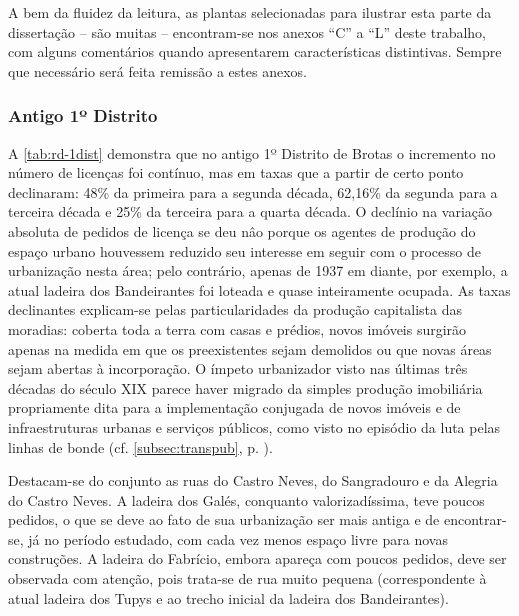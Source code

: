 A bem da fluidez da leitura, as plantas selecionadas para ilustrar esta parte da dissertação -- são muitas -- encontram-se nos anexos ``C'' a ``L'' deste trabalho, com alguns comentários quando apresentarem características distintivas. Sempre que necessário será feita remissão a estes anexos.

\subsubsection{Antigo 1º Distrito}


A \autoref{tab:rd-1dist} demonstra que no antigo 1º Distrito de Brotas o incremento no número de licenças foi contínuo, mas em taxas que a partir de certo ponto declinaram: 48\% da primeira para a segunda década, 62,16\% da segunda para a terceira década e 25\% da terceira para a quarta década. O declínio na variação absoluta de pedidos de licença se deu nâo porque os agentes de produção do espaço urbano houvessem reduzido seu interesse em seguir com o processo de urbanização nesta área; pelo contrário, apenas de 1937 em diante, por exemplo, a atual ladeira dos Bandeirantes foi loteada e quase inteiramente ocupada. As taxas declinantes explicam-se pelas particularidades da produção capitalista das moradias: coberta toda a terra com casas e prédios, novos imóveis surgirão apenas na medida em que os preexistentes sejam demolidos ou que novas áreas sejam abertas à incorporação. O ímpeto urbanizador visto nas últimas três décadas do século XIX parece haver migrado da simples produção imobiliária propriamente dita para a implementação conjugada de novos imóveis e de infraestruturas urbanas e serviços públicos, como visto no episódio da luta pelas linhas de bonde (cf. \autoref{subsec:transpub}, p. \pageref{subsec:transpub}).






Destacam-se do conjunto as ruas do Castro Neves, do Sangradouro e da Alegria do Castro Neves. A ladeira dos Galés, conquanto valorizadíssima, teve poucos pedidos, o que se deve ao fato de sua urbanização ser mais antiga e de encontrar-se, já no período estudado, com cada vez menos espaço livre para novas construções. A ladeira do Fabrício, embora apareça com poucos pedidos, deve ser observada com atenção, pois trata-se de rua muito pequena (correspondente à atual ladeira dos Tupys e ao trecho inicial da ladeira dos Bandeirantes).

